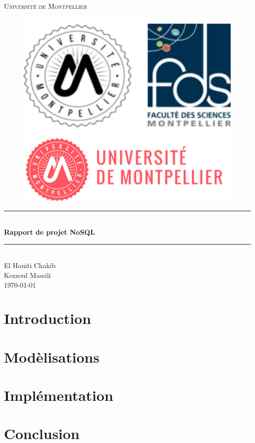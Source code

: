 \documentclass[12pt,titlepage]{article}
\begin{document}
\begin{titlepage}
\newcommand{\HRule}{\rule{\linewidth}{0.5mm}}
\center
\textsc{\LARGE
Université de Montpellier
} \\[1cm]
\begin{figure}[h]
	\begin{minipage}[c]{.46\linewidth}
		\centering
		\includegraphics[width=1\textwidth]{img/fds.png}
	\end{minipage}
	\hfill%
	\begin{minipage}[c]{.46\linewidth}
		\centering
		\includegraphics[width=1\textwidth]{img/univ-montpellier.png}
	\end{minipage}
\end{figure}

\HRule \\[0.4cm]
{ \huge \bfseries Rapport de projet NoSQL \\[0.15cm] }
\HRule \\[1.5cm]
El Houiti Chakib \\
Kezzoul Massili
\\[1cm]
\today \\ [1cm]
\end{titlepage}

\section*{Introduction}

\section{Modèlisations}

\section{Implémentation}

\section{Conclusion}
\end{document}
